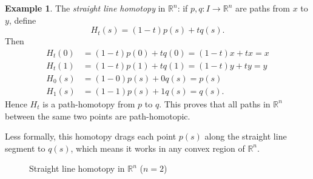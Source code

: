 \documentclass{article}
\theoremstyle{definition}
\newtheorem{exa}[thm]{Example}
\theoremstyle{remark}
\newcommand{\R}{\mathbb R}
\numberwithin{figure}{section}
\begin{document}
\begin{exa}
	The \emph{straight line homotopy} in $\R^n$: if $p, q : I \to \R^n$ are paths from $x$ to $y$, define
	\[
	H_t(s) = (1 - t)p(s) + tq(s).
	\]
	Then
	\begin{align*}
		H_t(0) &= (1 - t)p(0) + tq(0) = (1 - t)x + tx = x\\
		H_t(1) &= (1 - t)p(1) + tq(1) = (1 - t)y + ty = y\\
		H_0(s) &= (1 - 0)p(s) + 0q(s) = p(s)\\
		H_1(s) &= (1 - 1)p(s) + 1q(s) = q(s).
	\end{align*}
	Hence $H_t$ is a path-homotopy from $p$ to $q$. This proves that all paths in $\R^n$ between the same two points are path-homotopic.
	
	Less formally, this homotopy drags each point $p(s)$ along the straight line segment to $q(s)$, which means it works in any convex region of $\R^n$.
	\begin{figure}[h]
	\centering
	\caption{Straight line homotopy in $\R^n$ ($n = 2$)}
	\label{fig:straight line homotopy}
\end{figure}
\end{exa}
\end{document}
